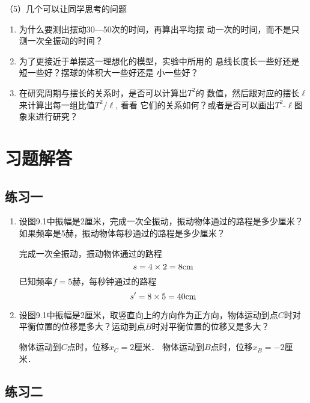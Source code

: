 （5）几个可以让同学思考的问题
\begin{enumerate}
\item 为什么要测出摆动30—50次的时间，再算出平均摆
动一次的时间，而不是只测一次全振动的时间？
\item 为了更接近于单摆这一理想化的模型，实验中所用的
悬线长度长一些好还是短一些好？摆球的体积大一些好还是
小一些好？
\item 在研究周期与摆长的关系时，是否可以计算出$T^2$的
数值，然后跟对应的摆长$\ell$来计算出每一组比值$T^2/\ell$, 看看
它们的关系如何？或者是否可以画出$T^2$-$\ell$图象来进行研究？
\end{enumerate}

\section{习题解答}

\subsection{练习一}
\begin{enumerate}
    \item 设图9.1中振幅是2厘米，完成一次全振动，振动物体通过的路程是多少厘米？如果频率是5赫，振动物体每秒通过的路程是多少厘米？
    
    \begin{solution}
        完成一次全振动，振动物体通过的路程
       \[ s=4\times 2=8{\rm cm}\]
        已知频率$f=5$赫，每秒钟通过的路程
       \[ s'=8\times 5=40{\rm cm}\]
    \end{solution}
    \item 设图9.1中振幅是2厘米，取竖直向上的方向作为正方向，物体运动到点$C$时对平衡位置的位移是多大？运动到点$B$时对平衡位置的位移又是多大？
    
    \begin{solution}
        物体运动到$C$点时，位移$x_C=2$厘米．
        物体运动到$B$点时，位移$x_B=-2$厘米． 
    \end{solution}
\end{enumerate}

	
\subsection{练习二}

